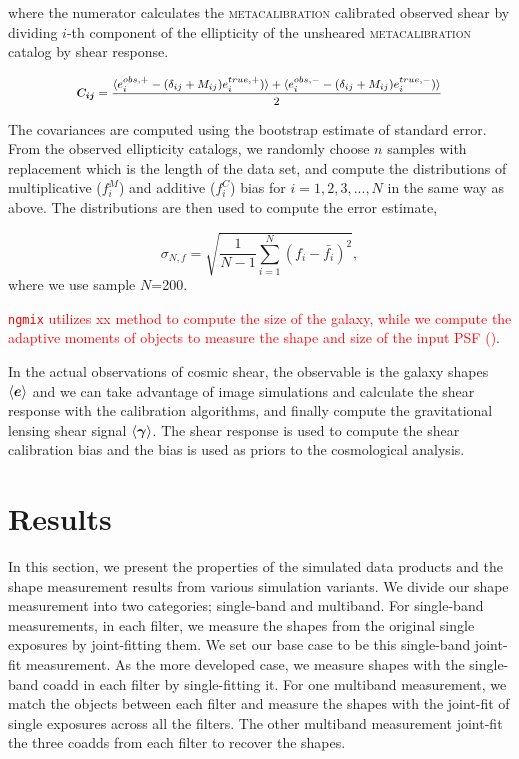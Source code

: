 \documentclass[fleqn,usenatbib]{mnras}
\begin{document}
where the numerator calculates the \textsc{metacalibration} calibrated observed shear by dividing $i$-th component of the ellipticity of the unsheared \textsc{metacalibration} catalog by shear response.


\begin{equation}
    \small
    \vb*{C_{ij}} = \frac{\langle e^{obs,+}_{i} - (\delta_{ij}+M_{ij})e^{true,+}_{i})\rangle + \langle e^{obs,-}_{i} - (\delta_{ij}+M_{ij})e^{true,-}_{i}) \rangle}{2}
\end{equation}


The covariances are computed using the bootstrap estimate of standard error. From the observed ellipticity catalogs, we randomly choose $n$ samples with replacement which is the length of the data set, and compute the distributions of multiplicative ($f^{M}_{i}$) and additive ($f^{C}_{i}$) bias for $i=1,2,3,...,N$ in the same way as above. The distributions are then used to compute the error estimate,  


\begin{equation}
    \sigma_{N,f} = \sqrt{\frac{1}{N-1} \sum_{i=1}^{N}(f_{i}-\bar{f_{i}})^{2}}, 
\end{equation}
where we use sample $N$=200. 

\textcolor{red}{\texttt{ngmix} utilizes xx method to compute the size of the galaxy, while we compute the adaptive moments of objects to measure the shape and size of the input PSF (\citealt{2003MNRAS.343..459H})}. 

In the actual observations of cosmic shear, the observable is the galaxy shapes $\langle\vb*{e}\rangle$ and we can take advantage of image simulations and calculate the shear response with the calibration algorithms, and finally compute the gravitational lensing shear signal $\langle\vb*{\gamma}\rangle$. The shear response is used to compute the shear calibration bias and the bias is used as priors to the cosmological analysis. 


\section{Results}
\label{sec:results}
In this section, we present the properties of the simulated data products and the shape measurement results from various simulation variants. We divide our shape measurement into two categories; single-band and multiband. For single-band measurements, in each filter, we measure the shapes from the original single exposures by joint-fitting them. We set our base case to be this single-band joint-fit measurement. As the more developed case, we measure shapes with the single-band coadd in each filter by single-fitting it. For one multiband measurement, we match the objects between each filter and measure the shapes with the joint-fit of single exposures across all the filters. The other multiband measurement joint-fit the three coadds from each filter to recover the shapes. 
\end{document}
